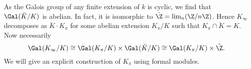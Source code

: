 \documentclass[../main.tex]{subfiles}
\begin{document}
As the Galois group of any finite extension
of $k$ is cyclic, we find that $\Gal(\breve K/K)$ is abelian. In fact,
it is isomorphic to $\hat \Z = \lim_n (\Z/n\Z)$. Hence
$K_\infty$ decomposes as $\breve K \cdot K_\pi$ for some abelian extension 
$K_\pi/K$ such that $K_\pi \cap \breve K = K$. Now necessarily 
$$\Gal(K_\infty/K) \cong \Gal(K_\pi/K) \times \Gal(\breve K/K)
\cong \Gal(K_\pi/K) \times \hat \Z.$$
We will give an explicit construction of $K_\pi$ using formal modules.

\end{document}
